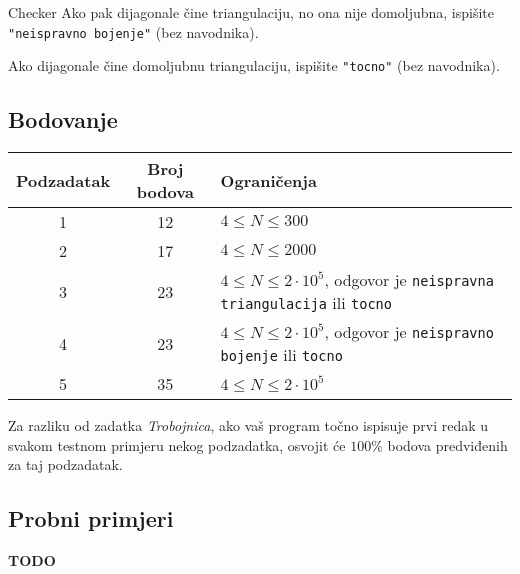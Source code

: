 \begin{statement}[
  problempoints=110,
  timelimit=1 sekund1,
  memorylimit=512 MiB,
]{Checker}
Ako pak dijagonale čine triangulaciju, no ona nije domoljubna, ispišite
\texttt{"neispravno bojenje"} (bez navodnika).

Ako dijagonale čine domoljubnu triangulaciju, ispišite \texttt{"tocno"}
(bez navodnika).

\subsection*{Bodovanje}
{\renewcommand{\arraystretch}{1.4}
  \setlength{\tabcolsep}{6pt}
  \begin{tabular}{ccl}
 Podzadatak & Broj bodova & Ograničenja \\ \midrule
  1 & 12 & $4 \le N \le 300$ \\
  2 & 17 & $4 \le N \le 2000$ \\
    3 & 23 & $4 \le N \le 2\cdot10^5$, odgovor je \texttt{neispravna triangulacija} ili \texttt{tocno} \\
    4 & 23 & $4 \le N \le 2\cdot10^5$, odgovor je \texttt{neispravno bojenje} ili \texttt{tocno} \\
  5 & 35 & $4 \le N \le 2\cdot10^5$
\end{tabular}}

Za razliku od zadatka \textit{Trobojnica}, ako vaš program točno ispisuje prvi redak u
svakom testnom primjeru nekog podzadatka, osvojit će $100\%$ bodova predviđenih
za taj podzadatak.

\subsection*{Probni primjeri}

\textbf{TODO}

\end{statement}

